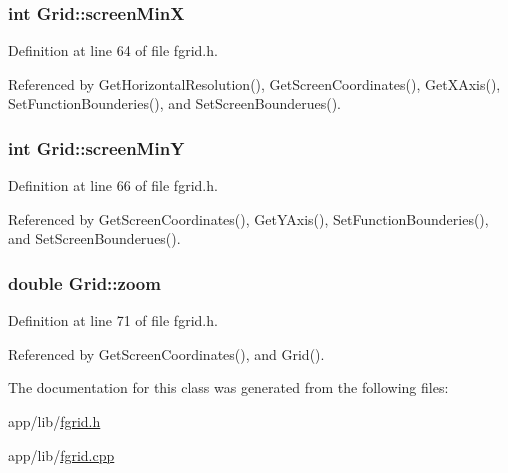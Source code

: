 \subsubsection[{\texorpdfstring{screen\+MinX}{screenMinX}}]{\setlength{\rightskip}{0pt plus 5cm}int Grid\+::screen\+MinX\hspace{0.3cm}{\ttfamily [private]}}\hypertarget{classGrid_a5876a8eaa41c1ac49fec464475d7cbb6}{}\label{classGrid_a5876a8eaa41c1ac49fec464475d7cbb6}


Definition at line 64 of file fgrid.\+h.



Referenced by Get\+Horizontal\+Resolution(), Get\+Screen\+Coordinates(), Get\+X\+Axis(), Set\+Function\+Bounderies(), and Set\+Screen\+Bounderues().

\subsubsection[{\texorpdfstring{screen\+MinY}{screenMinY}}]{\setlength{\rightskip}{0pt plus 5cm}int Grid\+::screen\+MinY\hspace{0.3cm}{\ttfamily [private]}}\hypertarget{classGrid_a18e1493a917be10c5454f44e1114fbdc}{}\label{classGrid_a18e1493a917be10c5454f44e1114fbdc}


Definition at line 66 of file fgrid.\+h.



Referenced by Get\+Screen\+Coordinates(), Get\+Y\+Axis(), Set\+Function\+Bounderies(), and Set\+Screen\+Bounderues().

\subsubsection[{\texorpdfstring{zoom}{zoom}}]{\setlength{\rightskip}{0pt plus 5cm}double Grid\+::zoom\hspace{0.3cm}{\ttfamily [private]}}\hypertarget{classGrid_a9a224c7ba4c55ff3672ae1b950796768}{}\label{classGrid_a9a224c7ba4c55ff3672ae1b950796768}


Definition at line 71 of file fgrid.\+h.



Referenced by Get\+Screen\+Coordinates(), and Grid().



The documentation for this class was generated from the following files\+:\begin{DoxyCompactItemize}
\item 
app/lib/\hyperlink{fgrid_8h}{fgrid.\+h}\item 
app/lib/\hyperlink{fgrid_8cpp}{fgrid.\+cpp}\end{DoxyCompactItemize}
